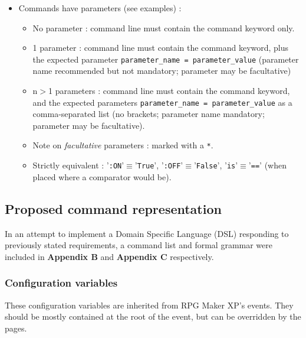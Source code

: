 \documentclass[11pt]{article}
\begin{document}
{\begin{itemize}
	Then, setting a timer for $x$ seconds could be as simple as storing (\verb|:PlayTime| + $x$) in a variable and testing it later against the current value of \verb|:PlayTime| !
	
	\item Commands have parameters (see examples) :
	\begin{itemize}
		\item No parameter : command line must contain the command keyword only.
		\item 1 parameter : command line must contain the command keyword, plus the expected parameter \verb|parameter_name = parameter_value| (parameter name recommended but not mandatory; parameter may be facultative)
		\item n$>$1 parameters : command line must contain the command keyword, and the expected parameters \verb|parameter_name = parameter_value| as a comma-separated list (no brackets; parameter name mandatory; parameter may be facultative).
		\item Note on \textit{facultative} parameters : marked with a \verb|*|.
		\item Strictly equivalent : '\verb|:ON|'$\equiv$'\verb|True|', '\verb|:OFF|'$\equiv$'\verb|False|', '\verb|is|'$\equiv$'\verb|==|' (when placed where a comparator would be).
	\end{itemize}
\end{itemize}


\subsection{Proposed command representation}

In an attempt to implement a Domain Specific Language (DSL) responding to previously stated requirements, a command list and formal grammar were included in \textbf{Appendix B} and \textbf{Appendix C} respectively.

\newpage
\subsubsection{Configuration variables}

These configuration variables are inherited from RPG Maker XP's events. They should be mostly contained at the root of the event, but can be overridden by the pages.

}
\end{document}
